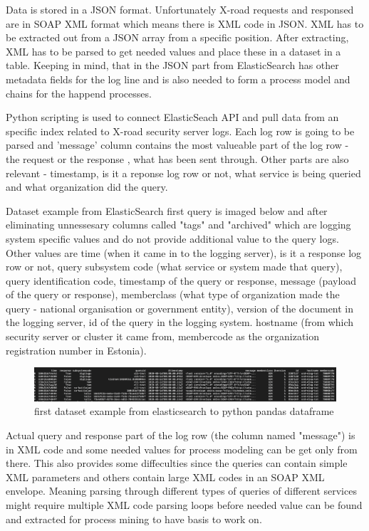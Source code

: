 \documentclass[a4paper, 12pt]{article}
\begin{document}
Data is stored in a JSON format. Unfortunately X-road requests and responsed are in SOAP XML format which means there is XML code in JSON. XML has to be extracted out from a JSON array from a specific position. After extracting, XML has to be parsed to get needed values and place these in a dataset in a table. Keeping in mind, that in the JSON part from ElasticSearch has other metadata fields for the log line and is also needed to form a process model and chains for the happend processes. 

Python scripting is used to connect ElasticSeach API and pull data from an specific index related to X-road security server logs. Each log row is going to be parsed and 'message' column contains the most valueable part of the log row -  the request or the response , what has been sent through. Other parts are also relevant - timestamp, is it a reponse log row or not, what service is being queried and what organization did the query. 

Dataset example from ElasticSearch first query is imaged below and after eliminating unnessesary columns called "tags" and "archived" which are logging system specific values and do not provide additional value to the query logs. Other values are time (when it came in to the logging server), is it a response log row or not, query subsystem code (what service or system made that query), query identification code, timestamp of the query or response, message (payload of the query or response), memberclass (what type of organization made the query - national organisation or government entity), version of the document in the logging server, id of the query in the logging system. hostname (from which security server or cluster it came from, membercode as the organization registration number in Estonia). 

\begin{figure}[h]
	\centering
	\includegraphics[width=15cm]{img/first_dataset_example.png} %
	\caption{first dataset example from elasticsearch to python pandas dataframe}
	\label{fig:first dataset example}
\end{figure}

Actual query and response part of the log row (the column named "message") is in XML code and some needed values for process modeling can be get only from there. This also provides some diffeculties since the queries can contain simple XML parameters and others contain large XML codes in an SOAP XML envelope. Meaning parsing through different types of queries of different services might require multiple XML code parsing loops before needed value can be found and extracted for process mining to have basis to work on. 
\end{document}
